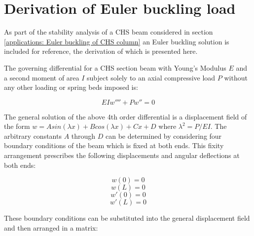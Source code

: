 \chapter[Derivation of Euler buckling load]{Derivation of Euler buckling load}
\label{app:Derivation of Euler buckling load}

As part of the stability analysis of a CHS beam considered in section \ref{applications: Euler buckling of CHS column} an Euler buckling solution is included for reference, the derivation of which is presented here.

The governing differential for a CHS section beam with Young's Modulus $E$  and a second moment of area $I$ subject solely to an axial compressive load $P$ without any other loading or spring beds imposed is:

\begin{equation} 
EI w'''' + Pw'' = 0
\label{eqapp4_1}
\end{equation}

The general solution of the above 4th order differential is a displacement field of the form $w = Asin(\lambda x) + Bcos(\lambda x) +  Cx + D$ where $\lambda^2 = P/EI$. The arbitrary constants $A$ through $D$ can be determined by considering four boundary conditions of the beam which is fixed at both ends. This fixity arrangement prescribes the following displacements and angular deflections at both ends:

\begin{equation} 
w(0) = 0
\label{eqapp4_2}
\end{equation}
\begin{equation} 
w(L) = 0
\label{eqapp4_3}
\end{equation}
\begin{equation} 
w'(0) = 0
\label{eqapp4_4}
\end{equation}
\begin{equation} 
w'(L) = 0
\label{eqapp4_5}
\end{equation}

These boundary conditions can be substituted into the general displacement field and then arranged in a matrix:

